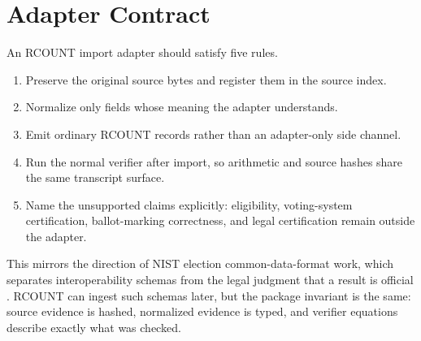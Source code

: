 \section{Adapter Contract}

An RCOUNT import adapter should satisfy five rules.

\begin{enumerate}
  \item Preserve the original source bytes and register them in the source
    index.
  \item Normalize only fields whose meaning the adapter understands.
  \item Emit ordinary RCOUNT records rather than an adapter-only side channel.
  \item Run the normal verifier after import, so arithmetic and source hashes
    share the same transcript surface.
  \item Name the unsupported claims explicitly: eligibility, voting-system
    certification, ballot-marking correctness, and legal certification remain
    outside the adapter.
\end{enumerate}

This mirrors the direction of NIST election common-data-format work, which
separates interoperability schemas from the legal judgment that a result is
official \citep{nist-election-results-cdf,nist-cdf-guidance}. RCOUNT can ingest
such schemas later, but the package invariant is the same: source evidence is
hashed, normalized evidence is typed, and verifier equations describe exactly
what was checked.
